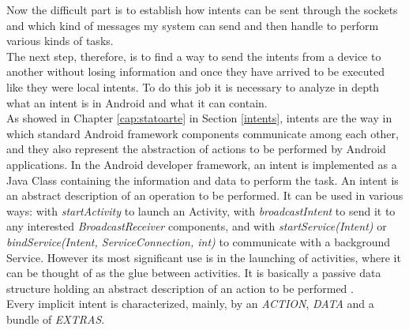 Now the difficult part is to establish how intents can be sent through the sockets and which kind of messages my system can send and then handle to perform various kinds of tasks.\\
The next step, therefore, is to find a way to send the intents from a device to another without losing information and once they have arrived to be executed like they were local intents. To do this job it is necessary to analyze in depth what an intent is in Android and what it can contain.\\
As showed in Chapter \ref{cap:statoarte} in Section \ref{intents}, intents are the way in which standard Android framework components communicate among each other, and they also represent the abstraction of actions to be performed by Android applications. In the Android developer framework, an intent is implemented as a Java Class containing the information and data to perform the task. An intent is an abstract description of an operation to be performed. It can be used in various ways: with \textit{startActivity} to launch an Activity, with \textit{broadcastIntent} to send it to any interested \textit{BroadcastReceiver} components, and  with \textit{startService(Intent)} or \textit{bindService(Intent, ServiceConnection, int)} to communicate with a background Service. However its most significant use is in the launching of activities, where it can be thought of as the glue between activities. It is basically a passive data structure holding an abstract description of an action to be performed \cite{android2017intent}.\\
Every implicit intent is characterized, mainly, by an \textit{ACTION}, \textit{DATA} and a bundle of \textit{EXTRAS}.
